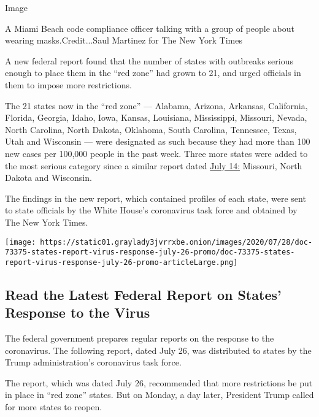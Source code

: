 Image

A Miami Beach code compliance officer talking with a group of people
about wearing masks.Credit...Saul Martinez for The New York Times

A new federal report found that the number of states with outbreaks
serious enough to place them in the ``red zone'' had grown to 21, and
urged officials in them to impose more restrictions.

The 21 states now in the ``red zone'' --- Alabama, Arizona, Arkansas,
California, Florida, Georgia, Idaho, Iowa, Kansas, Louisiana,
Mississippi, Missouri, Nevada, North Carolina, North Dakota, Oklahoma,
South Carolina, Tennessee, Texas, Utah and Wisconsin --- were designated
as such because they had more than 100 new cases per 100,000 people in
the past week. Three more states were added to the most serious category
since a similar report dated
\href{https://int.graylady3jvrrxbe.onion/data/documenttools/report-on-the-coronavirus-with-recommendations-for-states/3635f4849cdf3599/full.pdf}{July
14:} Missouri, North Dakota and Wisconsin.

The findings in the new report, which contained profiles of each state,
were sent to state officials by the White House's coronavirus task force
and obtained by The New York Times.

\href{https://www.nytimes3xbfgragh.onion/interactive/2020/07/28/us/states-report-virus-response-july-26.html}{}

\texttt{[image: https://static01.graylady3jvrrxbe.onion/images/2020/07/28/doc-73375-states-report-virus-response-july-26-promo/doc-73375-states-report-virus-response-july-26-promo-articleLarge.png]}

\hypertarget{read-the-latest-federal-report-on-states-response-to-the-virus}{%
\subsection{Read the Latest Federal Report on States' Response to the
Virus}\label{read-the-latest-federal-report-on-states-response-to-the-virus}}

The federal government prepares regular reports on the response to the
coronavirus. The following report, dated July 26, was distributed to
states by the Trump administration's coronavirus task force.

The report, which was dated July 26, recommended that more restrictions
be put in place in ``red zone'' states. But on Monday, a day later,
President Trump called for more states to reopen.

